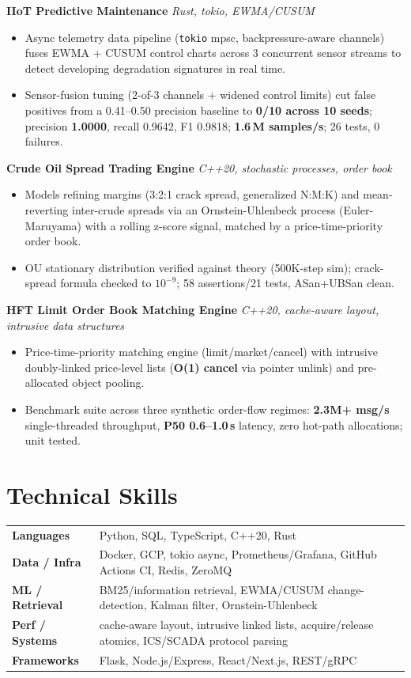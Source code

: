 \documentclass[10pt]{article}
\newcommand{\projectentry}[2]{%
  \noindent\textbf{#1} \hfill \textit{#2}\\[-0.3em]
}
\begin{document}
\projectentry{IIoT Predictive Maintenance}{Rust, tokio, EWMA/CUSUM}
\begin{itemize}
  \item Async telemetry data pipeline (\texttt{tokio} mpsc, backpressure-aware channels) fuses EWMA + CUSUM control charts across 3 concurrent sensor streams to detect developing degradation signatures in real time.
  \item Sensor-fusion tuning (2-of-3 channels + widened control limits) cut false positives from a 0.41--0.50 precision baseline to \textbf{0/10 across 10 seeds}; precision \textbf{1.0000}, recall 0.9642, F1 0.9818; \textbf{1.6\,M samples/s}; 26 tests, 0 failures.
\end{itemize}

\projectentry{Crude Oil Spread Trading Engine}{C++20, stochastic processes, order book}
\begin{itemize}
  \item Models refining margins (3:2:1 crack spread, generalized N:M:K) and mean-reverting inter-crude spreads via an Ornstein-Uhlenbeck process (Euler-Maruyama) with a rolling z-score signal, matched by a price-time-priority order book.
  \item OU stationary distribution verified against theory (500K-step sim); crack-spread formula checked to $10^{-9}$; 58 assertions/21 tests, ASan+UBSan clean.
\end{itemize}

\projectentry{HFT Limit Order Book Matching Engine}{C++20, cache-aware layout, intrusive data structures}
\begin{itemize}
  \item Price-time-priority matching engine (limit/market/cancel) with intrusive doubly-linked price-level lists (\textbf{O(1) cancel} via pointer unlink) and pre-allocated object pooling.
  \item Benchmark suite across three synthetic order-flow regimes: \textbf{2.3M+ msg/s} single-threaded throughput, \textbf{P50 0.6--1.0\,\textmu s} latency, zero hot-path allocations; unit tested.
\end{itemize}

\section*{Technical Skills}
\noindent
\begin{tabular}{@{}p{2.7cm}p{15.5cm}@{}}
\textbf{Languages} & Python, SQL, TypeScript, C++20, Rust \\
\textbf{Data / Infra} & Docker, GCP, tokio async, Prometheus/Grafana, GitHub Actions CI, Redis, ZeroMQ \\
\textbf{ML / Retrieval} & BM25/information retrieval, EWMA/CUSUM change-detection, Kalman filter, Ornstein-Uhlenbeck \\
\textbf{Perf / Systems} & cache-aware layout, intrusive linked lists, acquire/release atomics, ICS/SCADA protocol parsing \\
\textbf{Frameworks} & Flask, Node.js/Express, React/Next.js, REST/gRPC \\
\end{tabular}
\end{document}
